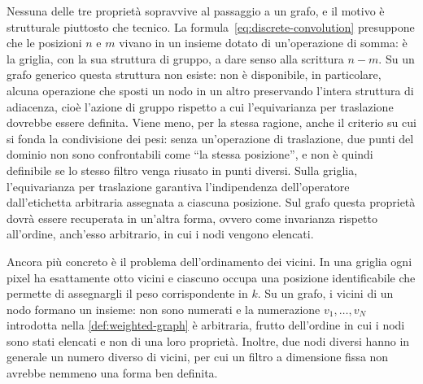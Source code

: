 Nessuna delle tre proprietà sopravvive al passaggio a un grafo, e il motivo è strutturale piuttosto che tecnico. La formula~\eqref{eq:discrete-convolution} presuppone che le posizioni $n$ e $m$ vivano in un insieme dotato di un'operazione di somma: è la griglia, con la sua struttura di gruppo, a dare senso alla scrittura $n-m$. Su un grafo generico questa struttura non esiste: non è disponibile, in particolare, alcuna operazione che sposti un nodo in un altro preservando l'intera struttura di adiacenza, cioè l'azione di gruppo rispetto a cui l'equivarianza per traslazione dovrebbe essere definita. Viene meno, per la stessa ragione, anche il criterio su cui si fonda la condivisione dei pesi: senza un'operazione di traslazione, due punti del dominio non sono confrontabili come \enquote{la stessa posizione}, e non è quindi definibile se lo stesso filtro venga riusato in punti diversi. Sulla griglia, l'equivarianza per traslazione garantiva l'indipendenza dell'operatore dall'etichetta arbitraria assegnata a ciascuna posizione. Sul grafo questa proprietà dovrà essere recuperata in un'altra forma, ovvero come invarianza rispetto all'ordine, anch'esso arbitrario, in cui i nodi vengono elencati.

Ancora più concreto è il problema dell'ordinamento dei vicini. In una griglia ogni pixel ha esattamente otto vicini e ciascuno occupa una posizione identificabile che permette di assegnargli il peso corrispondente in $k$. Su un grafo, i vicini di un nodo formano un insieme: non sono numerati e la numerazione $v_1,\dots,v_N$ introdotta nella \cref{def:weighted-graph} è arbitraria, frutto dell'ordine in cui i nodi sono stati elencati e non di una loro proprietà. Inoltre, due nodi diversi hanno in generale un numero diverso di vicini, per cui un filtro a dimensione fissa non avrebbe nemmeno una forma ben definita.

